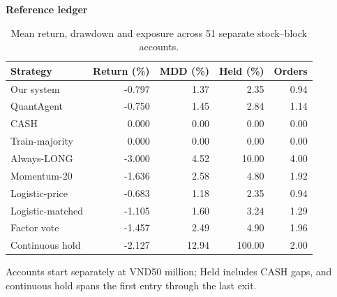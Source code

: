 \begin{table}[htb]
\centering\small
\setlength{\tabcolsep}{3pt}
\renewcommand{\arraystretch}{1.15}
\caption{Mean return, drawdown and exposure across 51 separate stock--block accounts.}
\label{tab:accounts}
\textbf{Reference ledger}\par\smallskip
\begin{tabular}{lrrrr}
\hline
Strategy & Return (\%) & MDD (\%) & Held (\%) & Orders \\
\hline
Our system & -0.797 & 1.37 & 2.35 & 0.94 \\
QuantAgent & -0.750 & 1.45 & 2.84 & 1.14 \\
CASH & 0.000 & 0.00 & 0.00 & 0.00 \\
Train-majority & 0.000 & 0.00 & 0.00 & 0.00 \\
Always-LONG & -3.000 & 4.52 & 10.00 & 4.00 \\
Momentum-20 & -1.636 & 2.58 & 4.80 & 1.92 \\
Logistic-price & -0.683 & 1.18 & 2.35 & 0.94 \\
Logistic-matched & -1.105 & 1.60 & 3.24 & 1.29 \\
Factor vote & -1.457 & 2.49 & 4.90 & 1.96 \\
Continuous hold & -2.127 & 12.94 & 100.00 & 2.00 \\
\hline
\end{tabular}\par\medskip
\begin{minipage}{\textwidth}\footnotesize Accounts start separately at VND50 million; Held includes CASH gaps, and continuous hold spans the first entry through the last exit.\end{minipage}
\end{table}
